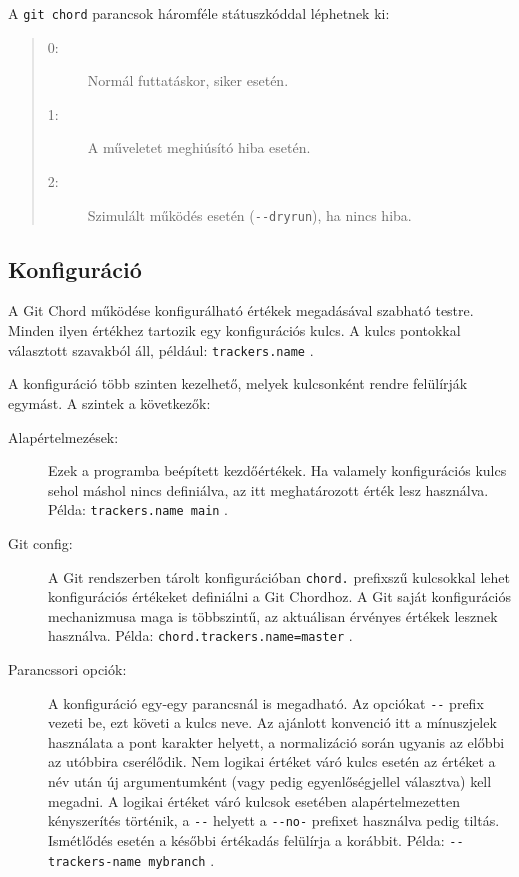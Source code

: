 \documentclass[final]{elteikthesis}[2025/03/25]
\begin{document}
A \texttt{git chord} parancsok háromféle státuszkóddal léphetnek ki:

\begin{quote}
\begin{description}
    \item[0:] Normál futtatáskor, siker esetén.
    \item[1:] A műveletet meghiúsító hiba esetén.
    \item[2:] Szimulált működés esetén (\verb|--dryrun|), ha nincs hiba.
\end{description}
\end{quote}

\subsection{Konfiguráció}

A Git Chord működése konfigurálható értékek megadásával szabható testre.
Minden ilyen értékhez tartozik egy konfigurációs kulcs.
A kulcs pontokkal választott szavakból áll, például: \verb|trackers.name| .

A konfiguráció több szinten kezelhető, melyek kulcsonként rendre felülírják egymást.
A szintek a következők:

\begin{description}
    \item[Alapértelmezések:]
        Ezek a programba beépített kezdőértékek.
        Ha valamely konfigurációs kulcs sehol máshol nincs definiálva, az itt meghatározott érték lesz használva.
        Példa: \verb|trackers.name main| .
    \item[Git config:]
        A Git rendszerben tárolt konfigurációban \verb|chord.| prefixszű kulcsokkal lehet konfigurációs értékeket definiálni a Git Chordhoz.
        A Git saját konfigurációs mechanizmusa maga is többszintű,
        az aktuálisan érvényes értékek lesznek használva.
        Példa: \verb|chord.trackers.name=master| .
    \item[Parancssori opciók:]
        A konfiguráció egy-egy parancsnál is megadható.
        Az opciókat \verb|--| prefix vezeti be, ezt követi a kulcs neve.
        Az ajánlott konvenció itt a mínuszjelek használata a pont karakter helyett,
        a normalizáció során ugyanis az előbbi az utóbbira cserélődik.
        Nem logikai értéket váró kulcs esetén az értéket a név után új argumentumként (vagy pedig egyenlőségjellel választva) kell megadni.
        A logikai értéket váró kulcsok esetében alapértelmezetten kényszerítés történik,
        a \verb|--| helyett a \verb|--no-| prefixet használva pedig tiltás.
        Ismétlődés esetén a későbbi értékadás felülírja a korábbit.
        Példa: \verb|--trackers-name mybranch| .
\end{description}
\end{document}
